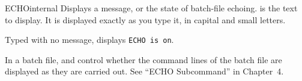 
\begin{DosEntry}{ECHO}{}{internal}
\Purpose Displays a message, or the state of batch-file echoing.
\Format {}
\Remarks
{} is the text to display.  It is displayed exactly as you
type it, in capital and small letters.

Typed with no message,  displays \texttt{ECHO is on}.

In a batch file,  and  control whether the
command lines of the batch file are displayed as they are carried out.  See
``ECHO Subcommand'' in Chapter~4.
\Example
{}
\end{DosEntry}

